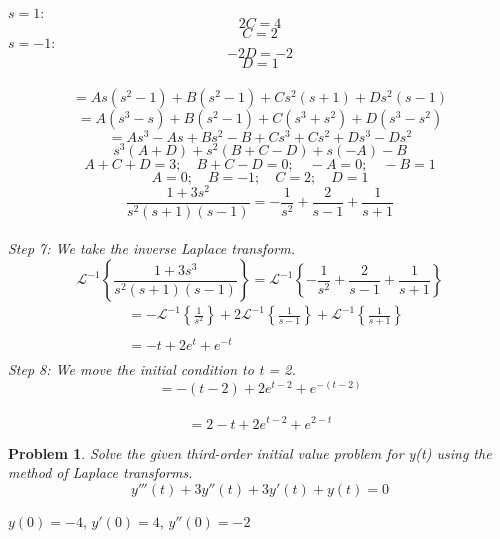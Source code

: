 \documentclass{article}
\newtheorem{problem}{Problem}
\begin{document}
    $s = 1:$
    $$2C = 4$$
    $$C = 2$$
    $s = -1:$
    $$-2D = -2$$
    $$D = 1$$
     \\
    $$= As(s^{2} - 1) + B(s^{2} - 1) + Cs^{2}(s + 1) + Ds^{2}(s - 1)$$
    $$= A(s^{3} - s) + B(s^{2} - 1) + C(s^{3} + s^{2}) + D(s^{3} - s^{2})$$ $$= As^{3} - As + Bs^{2} - B + Cs^{3} + Cs^{2} + Ds^{3} - Ds^{2}$$ $$s^{3}(A + D) + s^{2}(B + C - D) + s(-A) - B$$ $$A + C + D = 3; \quad B + C - D = 0;\quad  -A = 0; \quad -B = 1$$ $$A = 0;\quad B = -1;\quad C = 2;\quad D = 1$$  $$\frac{1 + 3s^{2}}{s^{2}(s + 1)(s - 1)} = -\frac{1}{s^{2}} + \frac{2}{s - 1} + \frac{1}{s + 1}$$ \\
    \textit{Step 7: We take the inverse Laplace transform.} \\
    $$\mathcal{L}^{-1} \left\{\frac{1 + 3s^{3}}{s^{2}(s + 1)(s - 1)}\right\} = \mathcal{L}^{-1} \left\{-\frac{1}{s^{2}} + \frac{2}{s - 1} + \frac{1}{s + 1}\right\}$$
    \begin{align*}
        &= -\mathcal{L}^{-1} \left\{\frac{1}{s^{2}}\right\} + 2\mathcal{L}^{-1} \left\{\frac{1}{s - 1}\right\} + \mathcal{L}^{-1} \left\{\frac{1}{s + 1}\right\} \\ \\
        &= -t + 2e^{t} + e^{-t}\\
    \end{align*}
    \textit{Step 8: We move the initial condition to t = 2.} \\
    $$=-(t - 2) + 2e^{t - 2} + e^{-(t - 2)}$$ \\
    $$= 2 -t + 2e^{t - 2} + e^{2 - t}$$
    \newpage


    \begin{problem}
        Solve the given third-order initial value
        problem for y(t) using the method of Laplace transforms.
        \[y'''(t) + 3y''(t) + 3y'(t) + y(t) = 0\] 
    \end{problem}
     \quad $y(0) = -4$, \quad $y'(0) = 4$, \quad $y''(0) = -2$ \\
\end{document}
